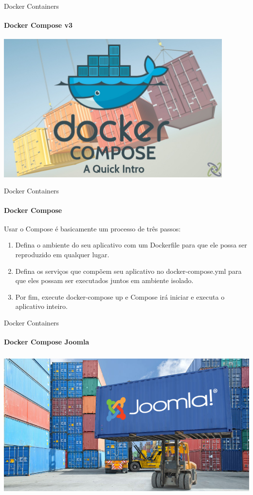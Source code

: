 \documentclass{beamer}
\begin{document}
\begin{frame}{Docker Containers}
    \framesubtitle{Docker Compose v3}
    \includegraphics[height=7.5cm]{img/docker-compose.png}
\end{frame}

\begin{frame}{Docker Containers}
    \framesubtitle{Docker Compose}
    Usar o Compose \'e basicamente um processo de tr\^es passos:
    \begin{enumerate}
        \item Defina o ambiente do seu aplicativo com um Dockerfile para que ele possa ser reproduzido em qualquer lugar.
        \item Defina os servi\c{c}os que comp\~oem seu aplicativo no docker-compose.yml para que eles possam ser executados juntos em ambiente isolado.
        \item Por fim, execute docker-compose up e Compose ir\'a iniciar e executa o aplicativo inteiro.
    \end{enumerate}
\end{frame}

\begin{frame}{Docker Containers}
    \framesubtitle{Docker Compose Joomla}
    \includegraphics[height=7.5cm]{img/joomla.jpg}
\end{frame}
\end{document}
